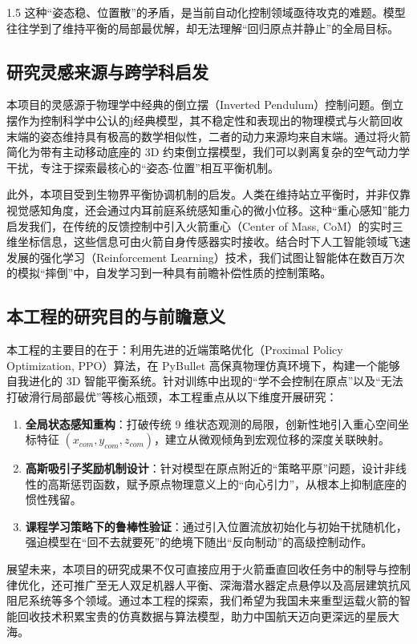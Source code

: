 \documentclass[zihao=-4]{ctexart}
\begin{document}
\begin{spacing}{1.5}
这种“姿态稳、位置散”的矛盾，是当前自动化控制领域亟待攻克的难题。模型往往学到了维持平衡的局部最优解，却无法理解“回归原点并静止”的全局目标。

\subsection{研究灵感来源与跨学科启发}
本项目的灵感源于物理学中经典的倒立摆（Inverted Pendulum）控制问题。倒立摆作为控制科学中公认的j经典模型，其不稳定性和表现出的物理模式与火箭回收末端的姿态维持具有极高的数学相似性，二者的动力来源均来自末端。通过将火箭简化为带有主动移动底座的 3D 约束倒立摆模型，我们可以剥离复杂的空气动力学干扰，专注于探索最核心的“姿态-位置”相互平衡机制。

此外，本项目受到生物界平衡协调机制的启发。人类在维持站立平衡时，并非仅靠视觉感知角度，还会通过内耳前庭系统感知重心的微小位移。这种“重心感知”能力启发我们，在传统的反馈控制中引入火箭重心（Center of Mass, CoM）的实时三维坐标信息，这些信息可由火箭自身传感器实时接收。结合时下人工智能领域飞速发展的强化学习（Reinforcement Learning）技术，我们试图让智能体在数百万次的模拟“摔倒”中，自发学习到一种具有前瞻补偿性质的控制策略。

\subsection{本工程的研究目的与前瞻意义}
本工程的主要目的在于：利用先进的近端策略优化（Proximal Policy Optimization, PPO）算法，在 PyBullet 高保真物理仿真环境下，构建一个能够自我进化的 3D 智能平衡系统。针对训练中出现的“学不会控制在原点”以及“无法打破滑行局部最优”等核心瓶颈，本工程重点从以下维度开展研究：

\begin{enumerate}
    \item \textbf{全局状态感知重构}：打破传统 9 维状态观测的局限，创新性地引入重心空间坐标特征 $(x_{com}, y_{com}, z_{com})$，建立从微观倾角到宏观位移的深度关联映射。
    \item \textbf{高斯吸引子奖励机制设计}：针对模型在原点附近的“策略平原”问题，设计非线性的高斯惩罚函数，赋予原点物理意义上的“向心引力”，从根本上抑制底座的惯性残留。
    \item \textbf{课程学习策略下的鲁棒性验证}：通过引入位置流放初始化与初始干扰随机化，强迫模型在“回不去就要死”的绝境下随出“反向制动”的高级控制动作。
\end{enumerate}

展望未来，本项目的研究成果不仅可直接应用于火箭垂直回收任务中的制导与控制律优化，还可推广至无人双足机器人平衡、深海潜水器定点悬停以及高层建筑抗风阻尼系统等多个领域。通过本工程的探索，我们希望为我国未来重型运载火箭的智能回收技术积累宝贵的仿真数据与算法模型，助力中国航天迈向更深远的星辰大海。

\end{spacing}
\end{document}
